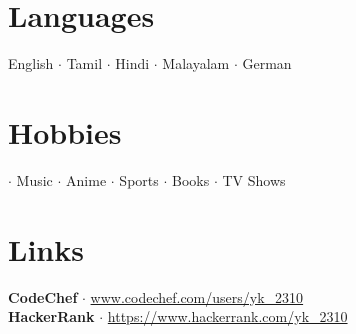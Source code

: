 \documentclass[letterpaper,12pt]{article}
\begin{document}
\section{Languages}
English $\cdot$ Tamil $\cdot$ Hindi $\cdot$ Malayalam  $\cdot$ German

\section{Hobbies}
 $\cdot$ Music $\cdot$ Anime $\cdot$ Sports $\cdot$ Books $\cdot$ TV Shows
 
 \section{Links}
 \textbf{CodeChef}
 $\cdot$ \href{www.codechef.com/users/yk_2310}{www.codechef.com/users/yk\_2310}\\ 
  \textbf{HackerRank}
 $\cdot$ \href{www.hackerrank.com/yk_2310}{https://www.hackerrank.com/yk\_2310}
\end{document}
